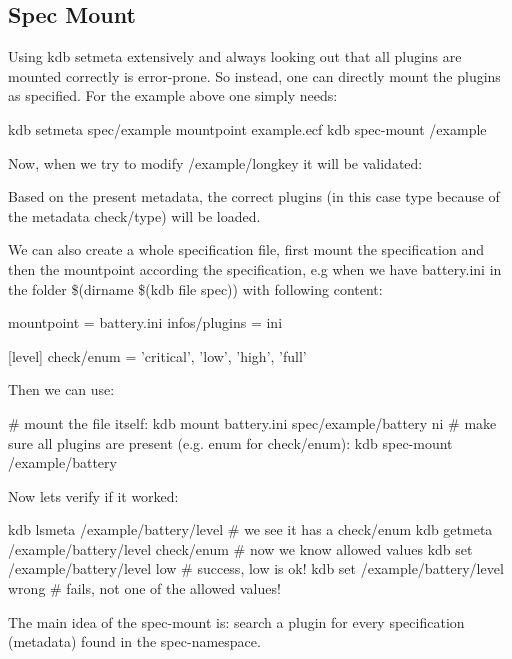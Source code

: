 \subsection*{Spec Mount}

Using {\ttfamily kdb setmeta} extensively and always looking out that all plugins are mounted correctly is error-\/prone. So instead, one can directly mount the plugins as specified. For the example above one simply needs\+: \begin{DoxyVerb}kdb setmeta spec/example mountpoint example.ecf
kdb spec-mount /example
\end{DoxyVerb}


Now, when we try to modify {\ttfamily /example/longkey} it will be validated\+: 


Based on the present metadata, the correct plugins (in this case {\ttfamily type} because of the metadata {\ttfamily check/type}) will be loaded.

We can also create a whole specification file, first mount the specification and then the mountpoint according the specification, e.\+g when we have {\ttfamily battery.\+ini} in the folder {\ttfamily \$(dirname \$(kdb file spec))} with following content\+: \begin{DoxyVerb}[]
mountpoint = battery.ini
infos/plugins = ini

[level]
check/enum = 'critical', 'low', 'high', 'full'
\end{DoxyVerb}


Then we can use\+: \begin{DoxyVerb}# mount the file itself:
kdb mount battery.ini spec/example/battery ni
# make sure all plugins are present (e.g. enum for check/enum):
kdb spec-mount /example/battery
\end{DoxyVerb}


Now lets verify if it worked\+: \begin{DoxyVerb}kdb lsmeta /example/battery/level
# we see it has a check/enum
kdb getmeta /example/battery/level check/enum
# now we know allowed values
kdb set /example/battery/level low
# success, low is ok!
kdb set /example/battery/level wrong
# fails, not one of the allowed values!
\end{DoxyVerb}


The main idea of the spec-\/mount is\+: search a plugin for every specification (metadata) found in the spec-\/namespace.

